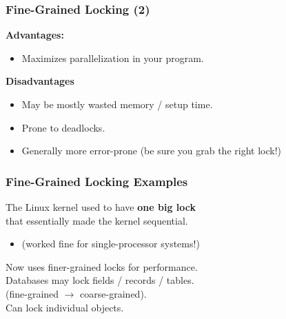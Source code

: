 \documentclass[aspectratio=43]{beamer}
\newenvironment{changemargin}[1]{%
  \begin{list}{}{%
    \setlength{\topsep}{0pt}%
    \setlength{\leftmargin}{#1}%
    \setlength{\rightmargin}{1em}
    \setlength{\listparindent}{\parindent}%
    \setlength{\itemindent}{\parindent}%
    \setlength{\parsep}{\parskip}%
  }%
  \item[]}{\end{list}}
\begin{document}
\begin{frame}
  \frametitle{Fine-Grained Locking (2)}

  \begin{changemargin}{1cm}
  {\bf Advantages:}
  
  \begin{itemize}
    \item Maximizes parallelization in your program.
  \end{itemize}
  \vfill
  {\bf Disadvantages}
  \begin{itemize}
    \item May be mostly wasted memory / setup time.
    \item Prone to deadlocks.
    \item Generally more error-prone (be sure you grab the right lock!)
  \end{itemize}
  \end{changemargin}
\end{frame}

\begin{frame}
  \frametitle{Fine-Grained Locking Examples}

  \begin{changemargin}{1cm}
    The Linux kernel used to have {\bf one big lock}\\ that essentially made
      the kernel sequential. 
    \begin{itemize}
      \item (worked fine for single-processor systems!)
    \end{itemize}
    Now uses finer-grained locks for performance.\\[2em]

    Databases may lock fields / records / tables.\\
    \qquad  (fine-grained $\rightarrow$ coarse-grained).\\[1em]

    Can lock individual objects.
  \end{changemargin}

\end{frame}
\end{document}

